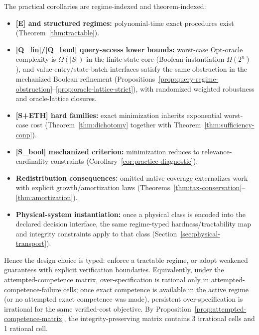 The practical corollaries are regime-indexed and theorem-indexed:
\begin{itemize}
\item \textbf{[E] and structured regimes:} polynomial-time exact procedures exist (Theorem~\ref{thm:tractable}).
\item \textbf{[Q\_fin]/[Q\_bool] query-access lower bounds:} worst-case Opt-oracle complexity is $\Omega(|S|)$ in the finite-state core (Boolean instantiation $\Omega(2^n)$), and value-entry/state-batch interfaces satisfy the same obstruction in the mechanized Boolean refinement (Propositions~\ref{prop:query-regime-obstruction}--\ref{prop:oracle-lattice-strict}), with randomized weighted robustness and oracle-lattice closures.
\item \textbf{[S+ETH] hard families:} exact minimization inherits exponential worst-case cost (Theorem~\ref{thm:dichotomy} together with Theorem~\ref{thm:sufficiency-conp}).
\item \textbf{[S\_bool] mechanized criterion:} minimization reduces to relevance-cardinality constraints (Corollary~\ref{cor:practice-diagnostic}).
\item \textbf{Redistribution consequences:} omitted native coverage externalizes work with explicit growth/amortization laws (Theorems~\ref{thm:tax-conservation}--\ref{thm:amortization}).
\item \textbf{Physical-system instantiation:} once a physical class is encoded into the declared decision interface, the same regime-typed hardness/tractability map and integrity constraints apply to that class (Section~\ref{sec:physical-transport}).
\end{itemize}

Hence the design choice is typed: enforce a tractable regime, or adopt weakened guarantees with explicit verification boundaries.
Equivalently, under the attempted-competence matrix, over-specification is rational only in attempted-competence-failure cells; once exact competence is available in the active regime (or no attempted exact competence was made), persistent over-specification is irrational for the same verified-cost objective.
By Proposition~\ref{prop:attempted-competence-matrix}, the integrity-preserving matrix contains 3 irrational cells and 1 rational cell.

